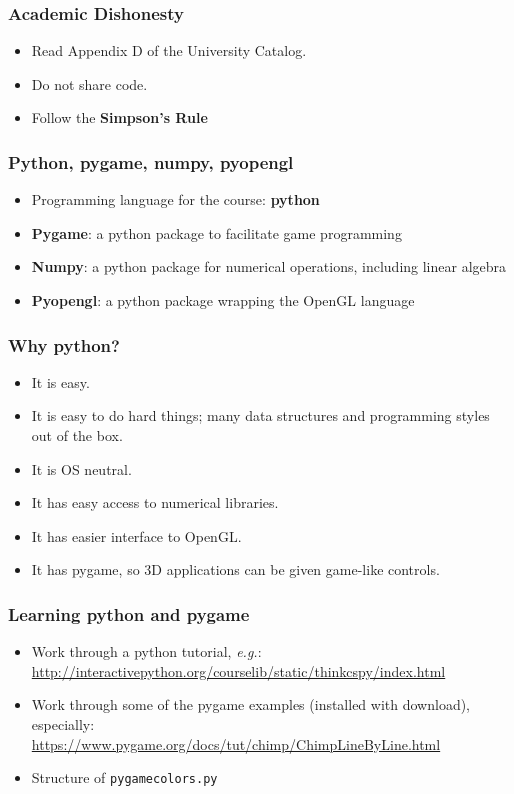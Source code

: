 \documentclass[slidestop,xcolor=pst]{beamer}
\newcommand{\sect}[1]{\begin{frame}\frametitle{#1}}
\begin{document}
\sect{Academic Dishonesty}
\begin{itemize}
\item Read Appendix D of the University Catalog.
\item Do not share code.
\item Follow the {\bf Simpson's Rule}
\end{itemize}
\end{frame}

\sect{Python, pygame, numpy, pyopengl}
\begin{itemize}
\item Programming language for the course: {\bf python}
\item {\bf Pygame}:  a python package to facilitate game programming
\item {\bf Numpy}:  a python package for numerical operations, including
  linear algebra
\item {\bf Pyopengl}:  a python package wrapping the OpenGL language
\end{itemize}
\end{frame}

\sect{Why python?}
\begin{itemize}

\item It is easy.
\item It is easy to do hard things; many data structures and
  programming styles out of the box. 
\item It is OS neutral.
\item It has easy access to numerical libraries.
\item It has easier interface to OpenGL.
\item It has pygame, so 3D applications can be given game-like controls.

\end{itemize}

\end{frame}

\sect{Learning python and pygame}
\begin{itemize}
  \item Work through a python tutorial, {\em e.g.}:\\ \url{http://interactivepython.org/courselib/static/thinkcspy/index.html}
\item Work through some of the pygame examples (installed with
  download),
  especially:\\
  \url{https://www.pygame.org/docs/tut/chimp/ChimpLineByLine.html}
  \item Structure of {\tt pygamecolors.py}
  \end{itemize}
\end{frame}
\end{document}
